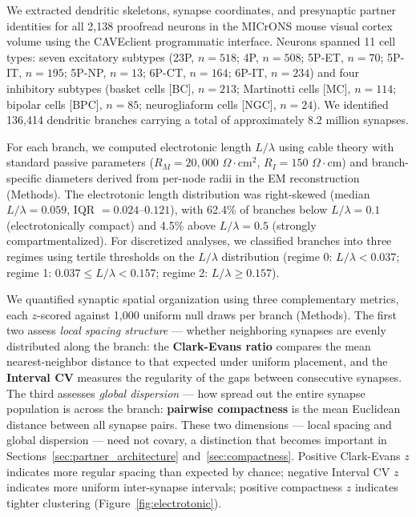 \documentclass[11pt]{article}
\begin{document}
We extracted dendritic skeletons, synapse coordinates, and presynaptic partner identities for all 2,138 proofread neurons in the MICrONS mouse visual cortex volume \citep{microns2021, turner2022} using the CAVEclient programmatic interface. Neurons spanned 11 cell types: seven excitatory subtypes (23P, $n = 518$; 4P, $n = 508$; 5P-ET, $n = 70$; 5P-IT, $n = 195$; 5P-NP, $n = 13$; 6P-CT, $n = 164$; 6P-IT, $n = 234$) and four inhibitory subtypes (basket cells [BC], $n = 213$; Martinotti cells [MC], $n = 114$; bipolar cells [BPC], $n = 85$; neurogliaform cells [NGC], $n = 24$). We identified 136,414 dendritic branches carrying a total of approximately 8.2 million synapses.

For each branch, we computed electrotonic length $L/\lambda$ using cable theory with standard passive parameters ($R_M = 20{,}000$ $\Omega \cdot \text{cm}^2$, $R_I = 150$ $\Omega \cdot \text{cm}$) and branch-specific diameters derived from per-node radii in the EM reconstruction (Methods). The electrotonic length distribution was right-skewed (median $L/\lambda = 0.059$, IQR $= 0.024$--$0.121$), with 62.4\% of branches below $L/\lambda = 0.1$ (electrotonically compact) and 4.5\% above $L/\lambda = 0.5$ (strongly compartmentalized). For discretized analyses, we classified branches into three regimes using tertile thresholds on the $L/\lambda$ distribution (regime 0: $L/\lambda < 0.037$; regime 1: $0.037 \leq L/\lambda < 0.157$; regime 2: $L/\lambda \geq 0.157$).

We quantified synaptic spatial organization using three complementary metrics, each $z$-scored against 1,000 uniform null draws per branch (Methods). The first two assess \textit{local spacing structure} --- whether neighboring synapses are evenly distributed along the branch: the \textbf{Clark-Evans ratio} \citep{clark1954} compares the mean nearest-neighbor distance to that expected under uniform placement, and the \textbf{Interval CV} measures the regularity of the gaps between consecutive synapses. The third assesses \textit{global dispersion} --- how spread out the entire synapse population is across the branch: \textbf{pairwise compactness} is the mean Euclidean distance between all synapse pairs. These two dimensions --- local spacing and global dispersion --- need not covary, a distinction that becomes important in Sections~\ref{sec:partner_architecture} and~\ref{sec:compactness}. Positive Clark-Evans $z$ indicates more regular spacing than expected by chance; negative Interval CV $z$ indicates more uniform inter-synapse intervals; positive compactness $z$ indicates tighter clustering (Figure~\ref{fig:electrotonic}).
\end{document}
